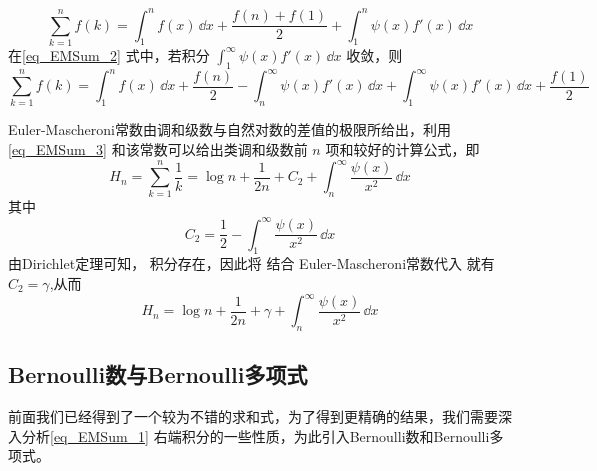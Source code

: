 \begin{equation}\label{eq_EMSum_2}
    \sum_{k=1}^{n}f(k)
    =\int_{1}^{n}f(x)\,\dd x+\frac{f(n)+f(1)}{2}+\int_{1}^{n}\psi(x)f'(x)\,\dd x
\end{equation}
在\autoref{eq_EMSum_2}  式中，若积分 $\displaystyle{\int_{1}^{\infty}\psi(x)f'(x)\,\dd x}$ 收敛，则
\begin{equation}\label{eq_EMSum_3}
    \sum_{k=1}^{n}f(k)=\int_{1}^{n}f(x)\,\dd x
    +\frac{f(n)}{2}-\int_{n}^{\infty}\psi(x)f'(x)\,\dd x
    +\int_{1}^{\infty}\psi(x)f'(x)\,\dd x+\frac{f(1)}{2}
\end{equation}
\begin{example}{}
Euler-Mascheroni常数由调和级数与自然对数的差值的极限所给出，利用\autoref{eq_EMSum_3} 和该常数可以给出类调和级数前 $n$ 项和较好的计算公式，即
\begin{equation}
    H_{n}=\sum_{k=1}^{n}\frac{1}{k}=\log n+\frac{1}{2n}+C_{2}
    +\int_{n}^{\infty}\frac{\psi(x)}{x^2}\,\dd x
\end{equation}
其中
\begin{equation}
    C_{2}=\frac{1}{2}-\int_{1}^{\infty}\frac{\psi(x)}{x^2}\,\dd x
\end{equation}
由Dirichlet定理可知， 积分存在，因此将 结合
Euler-Mascheroni常数代入 就有 $C_{2}=\gamma$,从而
\begin{equation}
    H_{n}=\log n+\frac{1}{2n}+\gamma+\int_{n}^{\infty}\frac{\psi(x)}{x^2}\,\dd x
\end{equation}
\end{example}

\subsection{Bernoulli数与Bernoulli多项式}

前面我们已经得到了一个较为不错的求和式，为了得到更精确的结果，我们需要深入分析\autoref{eq_EMSum_1} 右端积分的一些性质，为此引入Bernoulli数和Bernoulli多项式。


